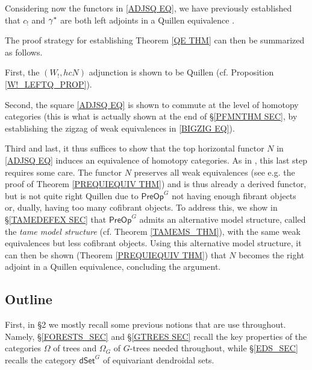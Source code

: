 \documentclass[a4paper,10pt]{article}%
\numberwithin{equation}{section}
\numberwithin{figure}{section}
\theoremstyle{definition} %
\newcommand{\1}{\ensuremath{\mathbbm 1}}%
\begin{document}
Considering now the functors in 
\eqref{ADJSQ EQ},
we have previously established that 
$c_!$ and $\gamma^{\**}$
are both left adjoints in a Quillen equivalence
\cite[Thms. 4.30 and 4.41]{BP_edss}.


The proof strategy for establishing 
Theorem \ref{QE THM}
can then be summarized as follows.

First, the $(W_!,hcN)$ adjunction
is shown to be Quillen (cf. Proposition \ref{W!_LEFTQ_PROP}).

Second, the square 
\eqref{ADJSQ EQ}
is shown to commute at the level of homotopy categories 
(this is what is actually shown at the end of 
\S \ref{PFMNTHM SEC}, 
by establishing the zigzag of weak equivalences in 
\eqref{BIGZIG EQ}).

Third and last, it thus suffices to show that the top horizontal 
functor $N$ in \eqref{ADJSQ EQ}
induces an equivalence of homotopy categories.
As in \cite{CM13b},
this last step requires some care.
The functor $N$ preserves all weak equivalences
(see e.g. the proof of Theorem \ref{PREQUIEQUIV THM})
and is thus already a derived functor,
but is not quite right Quillen 
due to $\mathsf{PreOp}^G$ not having enough fibrant objects 
or, dually, having too many cofibrant objects.
To address this, we show in \S \ref{TAMEDEFEX SEC}
that $\mathsf{PreOp}^G$
admits an alternative model structure, 
called the \emph{tame model structure} 
(cf. Theorem \ref{TAMEMS_THM}),
with the same weak equivalences but
less cofibrant objects.
Using this alternative model structure,
it can then be shown 
(Theorem \ref{PREQUIEQUIV THM})
that $N$ becomes the right adjoint in a Quillen equivalence,
concluding the argument.






\subsection{Outline}


First, in \S 2 we mostly recall 
some previous notions that are use throughout.
Namely, 
\S \ref{FORESTS_SEC} and \S \ref{GTREES SEC}
recall the key properties of the categories 
$\Omega$ of trees and 
$\Omega_G$ of $G$-trees needed throughout,
while 
\S \ref{EDS_SEC}
recalls the category 
$\mathsf{dSet}^G$
of equivariant dendroidal sets.
\end{document}
